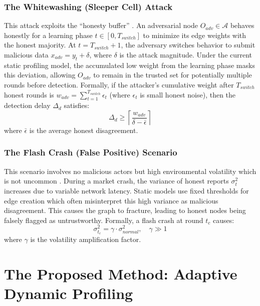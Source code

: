 \documentclass{ieeeaccess}
\begin{document}
\subsubsection{The Whitewashing (Sleeper Cell) Attack}
This attack exploits the ``honesty buffer'' \cite{b13}. An adversarial node $O_{adv} \in \mathcal{A}$ behaves honestly for a learning phase $t \in [0, T_{switch}]$ to minimize its edge weights with the honest majority. At $t = T_{switch} + 1$, the adversary switches behavior to submit malicious data $x_{adv} = y_t + \delta$, where $\delta$ is the attack magnitude. Under the current static profiling model, the accumulated low weight from the learning phase masks this deviation, allowing $O_{adv}$ to remain in the trusted set for potentially multiple rounds before detection. Formally, if the attacker's cumulative weight after $T_{switch}$ honest rounds is $w_{adv} = \sum_{t=1}^{T_{switch}} \epsilon_t$ (where $\epsilon_t$ is small honest noise), then the detection delay $\Delta_d$ satisfies:
\begin{equation}
\Delta_d \geq \left\lceil \frac{w_{adv}}{\delta - \bar{\epsilon}} \right\rceil
\label{eq:detection_delay}
\end{equation}
where $\bar{\epsilon}$ is the average honest disagreement.

\subsubsection{The Flash Crash (False Positive) Scenario}
This scenario involves no malicious actors but high environmental volatility which is not uncommon \cite{b14}. During a market crash, the variance of honest reports $\sigma^2_t$ increases due to variable network latency. Static models use fixed thresholds for edge creation which often misinterpret this high variance as malicious disagreement. This causes the graph to fracture, leading to honest nodes being falsely flagged as untrustworthy. Formally, a flash crash at round $t_c$ causes:
\begin{equation}
\sigma^2_{t_c} = \gamma \cdot \sigma^2_{normal}, \quad \gamma \gg 1
\label{eq:flash_crash}
\end{equation}
where $\gamma$ is the volatility amplification factor.

\section{The Proposed Method: Adaptive Dynamic Profiling}
\label{sec:proposed_method}
\end{document}

